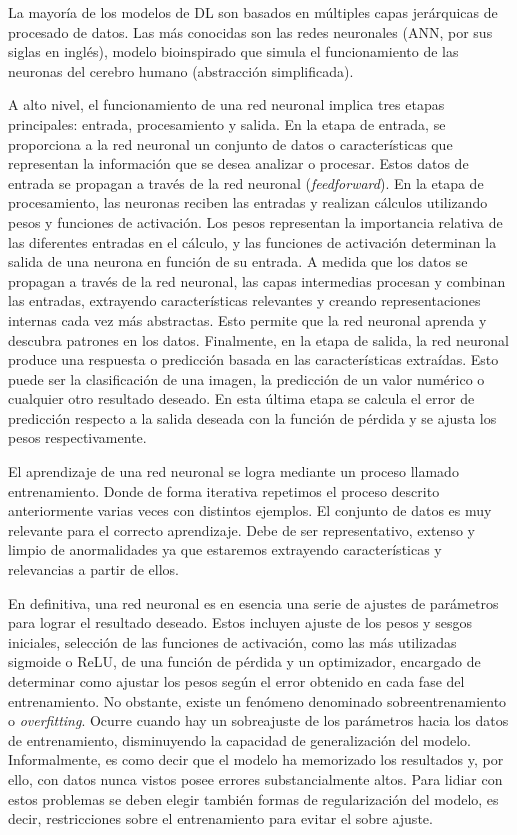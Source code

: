 La mayoría de los modelos de DL son basados en múltiples capas jerárquicas de 
procesado de datos. Las más conocidas son las redes neuronales (ANN, por sus siglas 
en inglés), modelo bioinspirado que simula el funcionamiento de las neuronas del cerebro
humano (abstracción simplificada)\cite{ANNForPattern,ANNCambridge}. 

A alto nivel, el funcionamiento de una red neuronal implica tres etapas principales: 
entrada, procesamiento y salida. En la etapa de entrada, se proporciona a la red 
neuronal un conjunto de datos o características que representan la información 
que se desea analizar o procesar. Estos datos de entrada se propagan a través 
de la red neuronal (\emph{feedforward}). En la etapa de procesamiento, las neuronas reciben las entradas 
y realizan cálculos utilizando pesos y funciones de activación. Los pesos representan 
la importancia relativa de las diferentes entradas en el cálculo, y las funciones 
de activación determinan la salida de una neurona en función de su entrada. A medida que los datos se propagan a través de la red neuronal, las capas intermedias 
procesan y combinan las entradas, extrayendo características relevantes y creando 
representaciones internas cada vez más abstractas. Esto permite que la red neuronal aprenda y 
descubra patrones en los datos. Finalmente, en la etapa de salida, la red neuronal 
produce una respuesta o predicción basada en las características extraídas. 
Esto puede ser la clasificación de una imagen, la predicción de un valor numérico o 
cualquier otro resultado deseado. En esta última etapa se calcula el error de 
predicción respecto a la salida deseada con la función de pérdida y se ajusta 
los pesos respectivamente.

El aprendizaje de una red neuronal se logra mediante un proceso llamado entrenamiento.
Donde de forma iterativa repetimos el proceso descrito anteriormente varias veces 
con distintos ejemplos. El conjunto de datos es muy relevante para el correcto 
aprendizaje. Debe de ser representativo, extenso y limpio de anormalidades ya que 
estaremos extrayendo características y relevancias a partir de ellos.

En definitiva, una red neuronal es en esencia una serie de ajustes de parámetros para lograr el resultado deseado. 
Estos incluyen ajuste de los pesos y sesgos iniciales, selección de las funciones de activación, 
como las más utilizadas sigmoide o ReLU, de una función de pérdida y un optimizador, 
encargado de determinar como ajustar los pesos según el error obtenido en cada fase del entrenamiento.
No obstante, existe un fenómeno denominado sobreentrenamiento o \emph{overfitting}. 
Ocurre cuando hay un sobreajuste de los parámetros
hacia los datos de entrenamiento, disminuyendo la capacidad de generalización del modelo. 
Informalmente, es como decir que el modelo ha memorizado los resultados y, por ello, 
con datos nunca vistos posee errores substancialmente altos. Para lidiar con estos 
problemas se deben elegir también formas de regularización del modelo, es decir, 
restricciones sobre el entrenamiento para evitar el sobre ajuste. 

